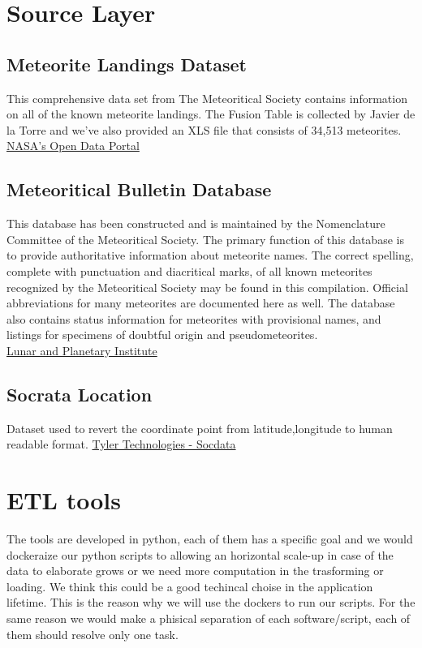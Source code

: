 \documentclass[conference]{IEEEtran}
\begin{document}
	\section{Source Layer}
	
	\subsection{Meteorite Landings Dataset}
	This comprehensive data set from The Meteoritical Society contains information on all of the known meteorite landings. The Fusion Table is collected by Javier de la Torre and we've also provided an XLS file that consists of 34,513 meteorites. \\
	\href{https://data.nasa.gov/Space-Science/Meteorite-Landings/gh4g-9sfh/about_data}{NASA's Open Data Portal}
	
	\subsection{Meteoritical Bulletin Database}
	This database has been constructed and is maintained by the Nomenclature Committee of the Meteoritical Society. The primary function of this database is to provide authoritative information about meteorite names. The correct spelling, complete with punctuation and diacritical marks, of all known meteorites recognized by the Meteoritical Society may be found in this compilation. Official abbreviations for many meteorites are documented here as well. The database also contains status information for meteorites with provisional names, and listings for specimens of doubtful origin and pseudometeorites. \\
	\href{https://www.lpi.usra.edu/meteor/}{Lunar and Planetary Institute}
	
	\subsection{Socrata Location}
	Dataset used to revert the coordinate point from latitude,longitude to human readable format.
	\href{https://dev.socrata.com/docs/datatypes/location.html#}{Tyler Technologies - Socdata}
				
	\section{ETL tools}
	The tools are developed in python, each of them has a specific goal and we would dockeraize our python scripts to allowing an horizontal scale-up in case of the data to elaborate grows or we need more computation in the trasforming or loading. We think this could be a good techincal choise in the application lifetime. This is the reason why we will use the dockers to run our scripts. For the same reason we would make a phisical separation of each software/script, each of them should resolve only one task.   
\end{document}
